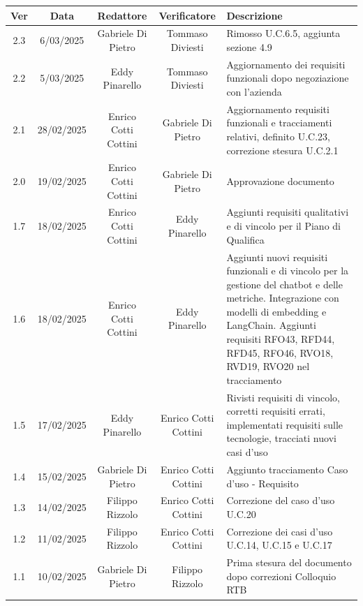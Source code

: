 \documentclass{article}
\begin{document}
\newpage
\begin{table}[h]
    \centering
    \renewcommand{\arraystretch}{1.2}
    \setlength{\tabcolsep}{5pt}
    \begin{tabular}{|c|c|c|c|m{}|}
        \hline
        \textbf{Ver} & \textbf{Data} & \textbf{Redattore} & \textbf{Verificatore} & \textbf{Descrizione} \\
        \hline
        2.3 & 6/03/2025 & Gabriele Di Pietro & Tommaso Diviesti & Rimosso U.C.6.5, aggiunta sezione 4.9 \\
        \hline
        2.2 & 5/03/2025 & Eddy Pinarello & Tommaso Diviesti & Aggiornamento dei requisiti funzionali dopo negoziazione con l'azienda \\
        \hline
        2.1 & 28/02/2025 & Enrico Cotti Cottini & Gabriele Di Pietro &  Aggiornamento requisiti funzionali e tracciamenti relativi, definito U.C.23, correzione stesura U.C.2.1 \\
        \hline
        2.0 & 19/02/2025 & Enrico Cotti Cottini & Gabriele Di Pietro & Approvazione documento  \\
        \hline
        1.7 & 18/02/2025 & Enrico Cotti Cottini & Eddy Pinarello & Aggiunti requisiti qualitativi e di vincolo per il Piano di Qualifica \\
        \hline
        1.6 & 18/02/2025 & Enrico Cotti Cottini & Eddy Pinarello & Aggiunti nuovi requisiti funzionali e di vincolo per la gestione del chatbot e delle metriche. Integrazione con modelli di embedding e LangChain. Aggiunti requisiti RFO43, RFD44, RFD45, RFO46, RVO18, RVD19, RVO20 nel tracciamento \\
        \hline
        1.5 & 17/02/2025 & Eddy Pinarello & Enrico Cotti Cottini & Rivisti requisiti di vincolo, corretti requisiti errati, implementati requisiti sulle tecnologie, tracciati nuovi casi d'uso \\
        \hline
        1.4 & 15/02/2025 & Gabriele Di Pietro & Enrico Cotti Cottini & Aggiunto tracciamento Caso d'uso - Requisito \\
        \hline
        1.3 & 14/02/2025 & Filippo Rizzolo & Enrico Cotti Cottini & Correzione del caso d'uso U.C.20 \\
        \hline
        1.2 & 11/02/2025 & Filippo Rizzolo & Enrico Cotti Cottini & Correzione dei casi d'uso U.C.14, U.C.15 e U.C.17 \\
        \hline
        1.1 & 10/02/2025 & Gabriele Di Pietro & Filippo Rizzolo & Prima stesura del documento dopo correzioni Colloquio RTB \\

\end{tabular}
\end{table}
\end{document}
